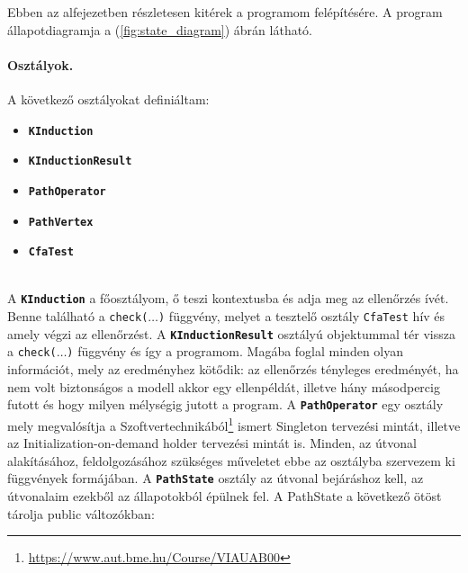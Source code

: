 Ebben az alfejezetben részletesen kitérek a programom felépítésére. A program állapotdiagramja a (\ref{fig:state_diagram}) ábrán látható.

\paragraph{Osztályok.}
A következő osztályokat definiáltam:

\begin{itemize}
	\item \textbf{\texttt{KInduction}}
	\item \textbf{\texttt{KInductionResult}}
	\item \textbf{\texttt{PathOperator}}
	\item \textbf{\texttt{PathVertex}}
	\item \textbf{\texttt{CfaTest}}
\end{itemize}
\ \\
A \textbf{\texttt{KInduction}} a főosztályom, ő teszi kontextusba és adja meg az ellenőrzés ívét. Benne található a \texttt{check($ \ldots $)} függvény, melyet a tesztelő osztály \texttt{CfaTest} hív és amely végzi az ellenőrzést.
\newline
\newline
A \textbf{\texttt{KInductionResult}} osztályú objektummal tér vissza a \texttt{check($ \ldots $)} függvény és így a programom. Magába foglal minden olyan információt, mely az eredményhez kötődik: az ellenőrzés tényleges eredményét, ha nem volt biztonságos a modell akkor egy ellenpéldát, illetve hány másodpercig futott és hogy milyen mélységig jutott a program.
\newline
\newline
A \textbf{\texttt{PathOperator}} egy osztály mely megvalósítja a Szoftvertechnikából\footnote{\url{https://www.aut.bme.hu/Course/VIAUAB00}} ismert Singleton tervezési mintát, illetve az Initialization-on-demand holder \cite{design_pattern_lazy_holder} tervezési mintát is. Minden, az útvonal alakításához, feldolgozásához szükséges műveletet ebbe az osztályba szervezem ki függvények formájában. 
\newline
\newline
A \textbf{\texttt{PathState}} osztály az útvonal bejáráshoz kell, az útvonalaim ezekből az állapotokból épülnek fel. A PathState a következő ötöst tárolja public változókban:
